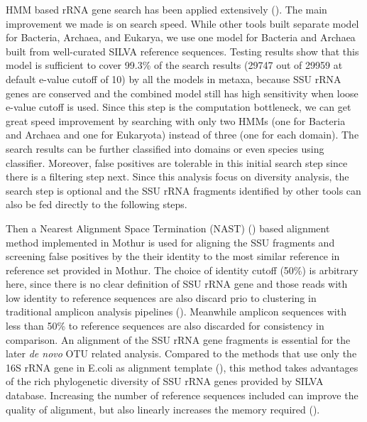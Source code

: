 \documentclass[12pt]{article}
\begin{document}
  HMM based rRNA gene search has been applied extensively (\cite{metarna,rrnaselector,metaxa}). The main improvement we made is on search speed. While other tools built separate model for Bacteria, Archaea, and Eukarya, we use one model for Bacteria and Archaea built from well-curated SILVA reference sequences. Testing results show that this model is sufficient to cover 99.3\% of the search results (29747 out of 29959 at default e-value cutoff of 10) by all the models in metaxa, because SSU rRNA genes are conserved and the combined model still has high sensitivity when loose e-value cutoff is used. Since this step is the computation bottleneck, we can get great speed improvement by searching with only two HMMs (one for Bacteria and Archaea and one for Eukaryota) instead of three (one for each domain). The search results can be further classified into domains or even species using classifier. Moreover, false positives are tolerable in this initial search step since there is a filtering step next. Since this analysis focus on diversity analysis, the search step is optional and the SSU rRNA fragments identified by other tools can also be fed directly to the following steps.

    Then a Nearest Alignment Space Termination (NAST) (\cite{mothuraligner2009}) based alignment method implemented in Mothur is used for aligning the SSU fragments and screening false positives by the their identity to the most similar reference in reference set provided in Mothur. The choice of identity cutoff (50\%) is arbitrary here, since there is no clear definition of SSU rRNA gene and those reads with low identity to reference sequences are also discard prio to clustering in traditional amplicon analysis pipelines (\cite{rdp2009, mothur, qiime}). Meanwhile amplicon sequences with less than 50\% to reference sequences are also discarded for consistency in comparison. An alignment of the SSU rRNA gene fragments is essential for the later {\em de novo} OTU related analysis. Compared to the methods that use only the 16S rRNA gene in E.coli as alignment template (\cite{kostas2013}), this method takes advantages of the rich phylogenetic diversity of SSU rRNA genes provided by SILVA database. Increasing the number of reference sequences included can improve the quality of alignment, but also linearly increases the memory required (\cite{mothuraligner2009,pynast}).
\end{document}
